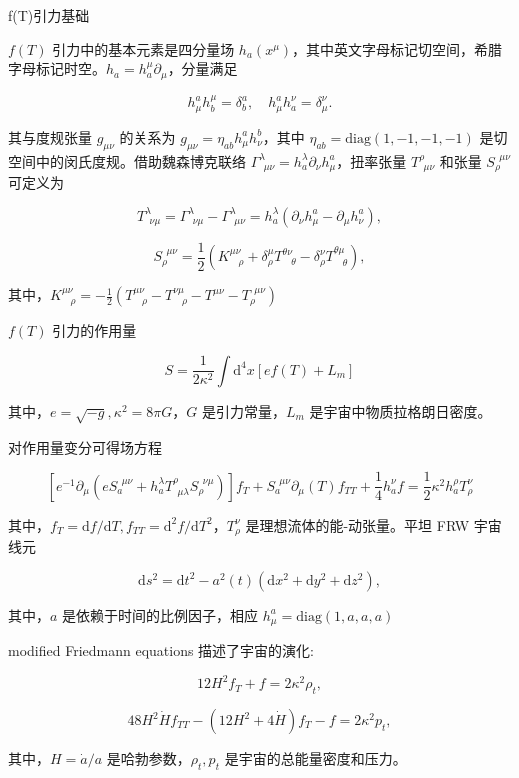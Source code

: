 \documentclass[9pt, dvipsnames]{beamer} %
\begin{document}
\begin{frame}{f(T)引力基础}

    $f(T)$ 引力中的基本元素是四分量场 $h_a(x^\mu)$，其中英文字母标记切空间，希腊字母标记时空。$h_a=h_a^\mu\partial_\mu$，分量满足

    $$
    h_\mu^a h_b^\mu = \delta_b^a,\quad h_\mu^a h_a^\nu = \delta_\mu^\nu.
    $$

    其与度规张量 $g_{\mu\nu}$ 的关系为 $ g_{\mu\nu}=\eta_{ab}h_\mu^ah_\nu^b$，其中 $\eta_{ab}=\mathrm{diag}(1,-1,-1,-1)$ 是切空间中的闵氏度规。借助魏森博克联络 $\Gamma_{~~\mu\nu}^{\lambda}=h_a^\lambda \partial_\nu h_\mu^a$，扭率张量 $T^\rho_{~~\mu\nu}$ 和张量 $S_\rho^{~~\mu\nu}$ 可定义为

    $$
    T^{\lambda}_{~~\nu\mu} = \Gamma^\lambda_{~~\nu\mu} - \Gamma^\lambda_{~~\mu\nu} = h_a^\lambda\left(\partial_\nu h_\mu^a - \partial_\mu h_\nu^a \right),
    $$

    $$
    S_\rho^{~~\mu\nu} = \frac{1 }{2 } \left(K^{\mu\nu}_{~~~~\rho} + \delta_\rho^\mu T^{\theta\nu}_{~~~~\theta} - \delta_\rho^\nu T^{\theta\mu}_{~~~~\theta} \right),
    $$

    其中，$K^{\mu\nu}_{~~~~\rho}=-\frac{1}{2}(T^{\mu\nu}_{~~~~\rho}-T^{\nu\mu}_{~~~~\rho}-T^{\mu\nu}-T_\rho^{~~\mu\nu}) $

    $f(T)$ 引力的作用量

    $$
    S = \frac{1}{2\kappa^2}\int \mathrm{d}^4 x [ef(T)+L_m]
    $$

    其中，$e=\sqrt{-g},\kappa^2=8\pi G$，$G$ 是引力常量，$L_m$ 是宇宙中物质拉格朗日密度。
    
\end{frame}

\begin{frame}
    对作用量变分可得场方程

    $$
    \left[e^{-1}\partial_\mu \left(e S_a^{~~\mu\nu} + h_a^\lambda T^\rho_{~~\mu\lambda} S_\rho^{~~\nu\mu} \right) \right] f_T + S_a^{~~\mu\nu} \partial_\mu(T) f_{TT} + \frac{1 }{4 } h_a^\nu f
    =\frac{1 }{2 } \kappa^2 h_a^\rho T_\rho^\nu
    $$
    
    其中，$f_T=\mathrm{d}f/\mathrm{d}T,f_{TT}=\mathrm{d}^2f/\mathrm{d}T^2$，$T_\rho^\nu$ 是理想流体的能-动张量。平坦 FRW 宇宙线元

    $$
    \mathrm{d}s^2
    =\mathrm{d}t^2 - a^2(t)\left(\mathrm{d}x^2+\mathrm{d}y^2+\mathrm{d}z^2 \right),
    $$

    其中，$a$ 是依赖于时间的比例因子，相应 $h_\mu^a=\mathrm{diag}(1,a,a,a)$

    modified Friedmann equations 描述了宇宙的演化:

    $$
    12 H^2 f_T + f = 2\kappa^2 \rho_t,
    $$

    $$
    48H^2\dot{H} f_{TT} - \left(12 H^2 + 4\dot{H} \right) f_T - f= 2\kappa^2 p_t,
    $$

    其中，$H=\dot{a}/a$ 是哈勃参数，$\rho_t,p_t$ 是宇宙的总能量密度和压力。
\end{frame}
\end{document}
